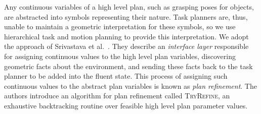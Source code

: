 
Any continuous variables of a high level plan, such as grasping poses for
objects, are abstracted into symbols representing their nature. Task
planners are, thus, unable to maintain a geometric interpretation for these symbols, so we use
hierarchical task and motion planning to provide this interpretation. We adopt the approach of
Srivastava et al.~\cite{srivastava2014combined}. They describe an \emph{interface layer} responsible
for assigning continuous values to the high level plan variables, discovering geometric facts about
the environment, and sending these facts back to the task planner to be added into the fluent state.
This process of assigning such continuous values to the abstract plan variables is known as \emph{plan refinement}.
The authors introduce an algorithm for plan refinement called \textsc{TryRefine}, an exhaustive
backtracking routine over feasible high level plan parameter values.

